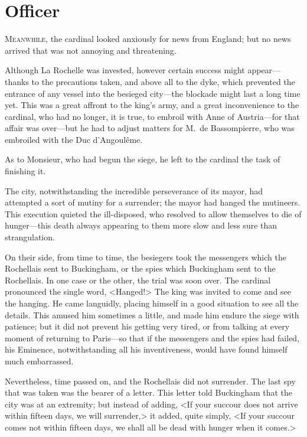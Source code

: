 
\chapter{Officer}

\lettrine{M}{eanwhile,} the cardinal looked anxiously for news from England; but no news arrived that was not annoying and threatening. 

\zz
Although La Rochelle was invested, however certain success might appear—thanks to the precautions taken, and above all to the dyke, which prevented the entrance of any vessel into the besieged city—the blockade might last a long time yet. This was a great affront to the king's army, and a great inconvenience to the cardinal, who had no longer, it is true, to embroil  with Anne of Austria—for that affair was over—but he had to adjust matters for M.~de Bassompierre, who was embroiled with the Duc d'Angoulême. 

As to Monsieur, who had begun the siege, he left to the cardinal the task of finishing it. 

The city, notwithstanding the incredible perseverance of its mayor, had attempted a sort of mutiny for a surrender; the mayor had hanged the mutineers. This execution quieted the ill-disposed, who resolved to allow themselves to die of hunger—this death always appearing to them more slow and less sure than strangulation. 

On their side, from time to time, the besiegers took the messengers which the Rochellais sent to Buckingham, or the spies which Buckingham sent to the Rochellais. In one case or the other, the trial was soon over. The cardinal pronounced the single word, <Hanged!> The king was invited to come and see the hanging. He came languidly, placing himself in a good situation to see all the details. This amused him sometimes a little, and made him endure the siege with patience; but it did not prevent his getting very tired, or from talking at every moment of returning to Paris—so that if the messengers and the spies had failed, his Eminence, notwithstanding all his inventiveness, would have found himself much embarrassed. 

Nevertheless, time passed on, and the Rochellais did not surrender. The last spy that was taken was the bearer of a letter. This letter told Buckingham that the city was at an extremity; but instead of adding, <If your succour does not arrive within fifteen days, we will surrender,> it added, quite simply, <If your succour comes not within fifteen days, we shall all be dead with hunger when it comes.> 

